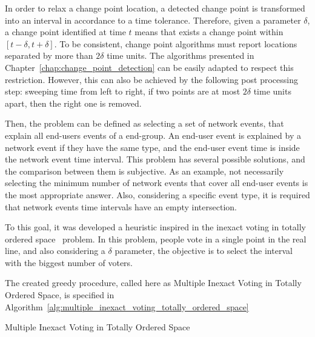 In order to relax a change point location, a detected change point is
transformed into an interval in accordance to a time tolerance.
Therefore, given a parameter $\delta$, a change point identified at
time $t$ means that exists a change point within
$[t - \delta, t + \delta]$. To be consistent,
change point algorithms must report locations separated by more than
$2 \delta$ time units. The algorithms presented in
Chapter~\ref{chap:change_point_detection}
can be easily adapted to respect this restriction. However, this can also be
achieved by the following post processing step:
sweeping time from left to right, if two
points are at most $2 \delta$ time units apart, then the right one is removed.

Then, the problem can be defined as selecting a set of network events,
that explain all end-users events of a end-group.
An end-user event is explained by a network event if they have the same type,
and the end-user event time is inside the network event time interval.
This problem has several possible solutions, and the comparison between
them is subjective. As an example, not
necessarily selecting the minimum number of network events that cover all
end-user events is the most appropriate answer.
Also, considering a specific event type, it is required that network events
time intervals have an empty intersection.

To this goal, it was developed a heuristic inspired in the inexact voting in
totally
ordered space~\cite{voting_algorithms} problem. In this problem, people
vote in a single point in the real line, and also considering a $\delta$
parameter, the objective is to
select the interval with the biggest number of voters.

The created greedy procedure, called here as Multiple Inexact Voting in Totally
Ordered Space, is specified in
Algorithm~\ref{alg:multiple_inexact_voting_totally_ordered_space}

\begin{algorithm}[H]
\caption{Multiple Inexact Voting in Totally Ordered Space}
\label{alg:multiple_inexact_voting_totally_ordered_space}
    \begin{algorithmic}[1]
        \EndWhile{}
    \end{algorithmic}
\end{algorithm}

